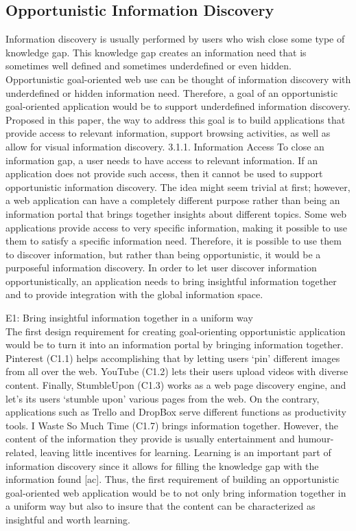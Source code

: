 \documentclass{casconpaper}
\begin{document}
{\subsection{ Opportunistic Information Discovery}

Information discovery is usually performed by users who wish close some type of knowledge gap. This knowledge gap creates an information need that is sometimes well defined and sometimes underdefined or even hidden. Opportunistic goal-oriented web use can be thought of information discovery with underdefined or hidden information need. Therefore, a goal of an opportunistic goal-oriented application would be to support underdefined information discovery. Proposed in this paper, the way to address this goal is to build applications that provide access to relevant information, support browsing activities, as well as allow for visual information discovery. 
3.1.1. Information Access
To close an information gap, a user needs to have access to relevant information. If an application does not provide such access, then it cannot be used to support opportunistic information discovery. The idea might seem trivial at first; however, a web application can have a completely different purpose rather than being an information portal that brings together insights about different topics. Some web applications provide access to very specific information, making it possible to use them to satisfy a specific information need. Therefore, it is possible to use them to discover information, but rather than being opportunistic, it would be a purposeful information discovery. In order to let user discover information opportunistically, an application needs to bring insightful information together and to provide integration with the global information space.

E1: Bring insightful information together in a uniform way \\
The first design requirement for creating goal-orienting opportunistic application would be to turn it into an information portal by bringing information together. Pinterest (C1.1) helps accomplishing that by letting users ‘pin’ different images from all over the web. YouTube (C1.2) lets their users upload videos with diverse content. Finally, StumbleUpon (C1.3) works as a web page discovery engine, and let’s its users ‘stumble upon’ various pages from the web. On the contrary, applications such as Trello and DropBox serve different functions as productivity tools. I Waste So Much Time (C1.7) brings information together. However, the content of the information they provide is usually entertainment and humour-related, leaving little incentives for learning. Learning is an important part of information discovery since it allows for filling the knowledge gap with the information found [ac]. Thus, the first requirement of building an opportunistic goal-oriented web application would be to not only bring information together in a uniform way but also to insure that the content can be characterized as insightful and worth learning. 

}
\end{document}
